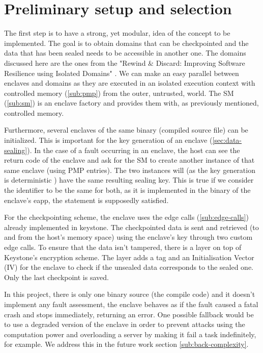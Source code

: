 \documentclass[11pt,a4paper]{report}
\begin{document}
\section{Preliminary setup and selection}
The first step is to have a strong, yet modular, idea of the concept to be implemented.
The goal is to obtain domains that can be checkpointed and the data that has been sealed needs to be accessible in another one.
The domains discussed here are the ones from the "Rewind $\&$ Discard: Improving Software Resilience using Isolated Domains" \cite{sdrad}.
We can make an easy parallel between enclaves and domains as they are executed in an isolated execution context with controlled memory (\ref{sub:pmp}) from the outer, untrusted, world.
The SM (\ref{sub:sm}) is an enclave factory and provides them with, as previously mentioned, controlled memory.

Furthermore, several enclaves of the same binary (compiled source file) can be initialized. 
This is important for the key generation of an enclave (\ref{sec:data-sealing}).
In the case of a fault occurring in an enclave, the host can see the return code of the enclave and ask for the SM to create another instance of that same enclave (using PMP entries).
The two instances will (as the key generation is deterministic \cite{keystone-docs, review-keystone}) have the same resulting sealing key.
This is true if we consider the identifier to be the same for both, as it is implemented in the binary of the enclave's eapp, the statement is supposedly satisfied.

For the checkpointing scheme, the enclave uses the edge calls (\ref{sub:edge-calls}) already implemented in keystone. 
The checkpointed data is sent and retrieved (to and from the host's memory space) using the enclave's key through two custom edge calls. 
To ensure that the data isn't tampered, there is a layer on top of Keystone's encryption scheme.
The layer adds a tag and an Initialisation Vector (IV) for the enclave to check if the unsealed data corresponds to the sealed one.
Only the last checkpoint is saved.

In this project, there is only one binary source (the compile code) and it doesn't implement any fault assessment, the enclave behaves as if the fault caused a fatal crash and stops immediately, returning an error.
One possible fallback would be to use a degraded version of the enclave in order to prevent attacks using the computation power and overloading a server by making it fail a task indefinitely, for example. 
We address this in the future work section \ref{sub:back-complexity}.
\end{document}
